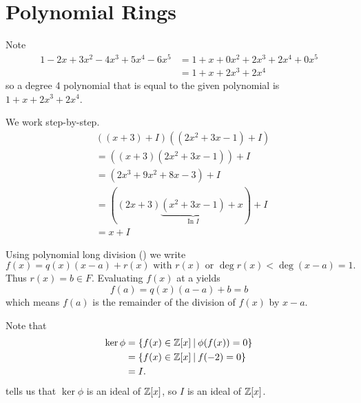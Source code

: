 \section{Polynomial Rings}
\begin{questions}
    \item Note
    \begin{align*}
        1 - 2x + 3x^2 - 4x^3 + 5x^4 - 6x^5 &= 1 + x + 0x^2 + 2x^3 + 2x^4 + 0x^5\\
        &= 1 + x + 2x^3 + 2x^4
    \end{align*}
    so a degree 4 polynomial that is equal to the given polynomial is $1 + x + 2x^3 + 2x^4$.

    \item We work step-by-step.
    \begin{align*}
        &\left((x + 3) + I\right)\left((2x^2 + 3x - 1) + I\right)\\
        &= \left((x + 3)(2x^2+3x-1)\right) + I\\
        &= \left(2x^3 + 9x^2 + 8x - 3\right) + I\\
        &= \left((2x+3)\underbrace{(x^2+3x-1)}_{\text{In }I} + x\right) + I\\
        &= x + I
    \end{align*}

    \item %
    
    \item %
    
    \item Using polynomial long division () we write
    \[
        f(x) = q(x)(x-a) + r(x) \text{ with } r(x) \text{ or } \deg r(x) < \deg(x-a) = 1.
    \]
    Thus $r(x) = b \in F$. Evaluating $f(x)$ at a yields
    \[
        f(a) = q(x)(a-a) + b = b
    \]
    which means $f(a)$ is the remainder of the division of $f(x)$ by $x-a$.

    \item \begin{partquestions}{\roman*}
        \item Note that
        \begin{align*}
            \ker\phi &= \{f(x) \in \Z[x] \vert \phi(f(x)) = 0\}\\
            &= \{f(x) \in \Z[x] \vert f(-2) = 0\}\\
            &= I.
        \end{align*}
         tells us that $\ker\phi$ is an ideal of $\mathbb{Z}[x]$, so $I$ is an ideal of $\mathbb{Z}[x]$.


\end{partquestions}
\end{questions}
